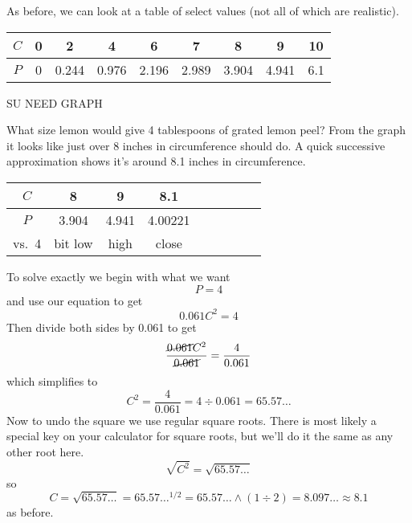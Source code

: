 As before, we can look at a table of select values (not all of which are realistic).

\begin{center}
\begin{tabular} {|c |c |c |c |c |c |c |c |c|}\hline
$C$ & 0 & 2 & 4 & 6 & 7 & 8 & 9 & 10 \\ \hline
$P$ & 0 & 0.244 & 0.976 & 2.196 & 2.989 & 3.904 & 4.941 & 6.1 \\ \hline
\end{tabular}
\end{center}

SU NEED GRAPH \vspace{2in}

What size lemon would give 4 tablespoons of grated lemon peel?  From the graph it looks like just over 8 inches in circumference should do.  A quick successive approximation shows it's around 8.1 inches in circumference.

\begin{center}
\begin{tabular} {|c |c |c |c |c |c |c |c |c|}\hline
$C$ & 8 & 9 &  8.1\\ \hline
$P$ & 3.904 & 4.941& 4.00221 \\ \hline
vs.\ 4 & bit low & high & close \\ \hline
\end{tabular}
\end{center}

To solve exactly we begin with what we want $$P=4$$ and use our equation to get $$0.061C^2=4$$ Then divide both sides by 0.061 to get $$\frac{\cancel{0.061}C^2}{\cancel{0.061}}= \frac{4}{0.061}$$ which simplifies to $$C^2 = \frac{4}{0.061} = 4 \div 0.061 = 65.57\ldots $$ Now to undo the square we use regular square roots.  There is most likely a special key on your calculator for square roots, but we'll do it the same as any other root here. $$\sqrt{C^2} = \sqrt{65.57\ldots} $$ so $$C = \sqrt{65.57\ldots} = 65.57\ldots^{1/2} = 65.57\ldots \wedge ( 1 \div 2) = 8.097\dots \approx 8.1$$ as before. 


%